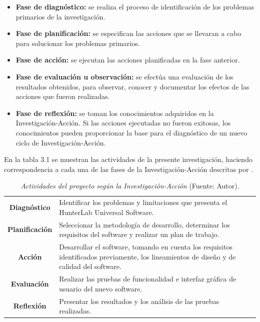 	\begin{itemize}
		\item \textbf{Fase de diagn\'{o}stico:} se realiza el proceso de identificaci\'{o}n de los problemas primarios de la investigaci\'{o}n.
		\item \textbf{Fase de planificaci\'{o}n:} se especifican las acciones que se llevaran a cabo para solucionar los problemas primarios.
		\item \textbf{Fase de acci\'{o}n:} se ejecutan las acciones planificadas en la fase anterior.
		\item \textbf{Fase de evaluaci\'{o}n u observaci\'{o}n:} se efect\'{u}a una evaluaci\'{o}n de los resultados obtenidos, para observar, conocer y documentar los efectos de las acciones que fueron realizadas.
		\item \textbf{Fase de reflexi\'{o}n:} se toman los conocimientos adquiridos en la Investigaci\'{o}n-Acci\'{o}n. Si las acciones ejecutadas no fueron exitosas, los conocimientos pueden proporcionar la base para el diagn\'{o}stico de un nuevo ciclo de Investigaci\'{o}n-Acci\'{o}n.
	\end{itemize}

En la tabla 3.1 se muestran las actividades de la presente investigaci\'{o}n, haciendo correspondencia a cada una de las fases de la Investigaci\'{o}n-Acci\'{o}n descritas por \cite{Baskerville}.

	\begin{table}[t]
		\small
		\caption[Actividades del proyecto seg\'{u}n la Investigaci\'{o}n-Acci\'{o}n]{\textit{Actividades del proyecto seg\'{u}n la Investigaci\'{o}n-Acci\'{o}n} (Fuente: Autor).}
		\centering
		\setlength{\extrarowheight}{\altocelda}
		\begin{tabulary}{\anchotabla}{|c|J|}
			\hline
			 & \\ \hline
			\textbf{Diagn\'{o}stico} & Identificar los problemas y limitaciones que presenta el HunterLab Universal Software.\\ \hline
			\textbf{Planificaci\'{o}n} & Seleccionar la metodolog\'{i}a de desarrollo, determinar los requisitos del software y realizar un plan de trabajo.
\\ \hline
			\textbf{Acci\'{o}n} & Desarrollar el software, tomando en cuenta los requisitos identificados previamente, los lineamientos de dise\~{n}o y de calidad del software.\\ \hline
			\textbf{Evaluaci\'{o}n} & Realizar las pruebas de funcionalidad e interfaz gr\'{a}fica de usuario del nuevo software.\\ \hline
			\textbf{Reflexi\'{o}n} & Presentar los resultados y los an\'{a}lisis de las pruebas realizadas.\\ \hline
		\end{tabulary}
	\end{table}

